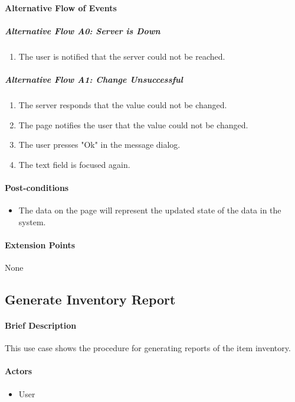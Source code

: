 \documentclass{article}
\begin{document}
\paragraph{Alternative Flow of Events}

\subparagraph{Alternative Flow A0: Server is Down}
\begin{enumerate}
\item The user is notified that the server could not be reached.
\end{enumerate}

\subparagraph{Alternative Flow A1: Change Unsuccessful}
\begin{enumerate}
\item The server responds that the value could not be changed.
\item The page notifies the user that the value could not be changed.
\item The user presses "Ok" in the message dialog.
\item The text field is focused again.
\end{enumerate}

\paragraph{Post-conditions}
\begin{itemize}
\item The data on the page will represent the updated state of the data in the system.
\end{itemize}

\paragraph{Extension Points}
None

\subsection{Generate Inventory Report}

\paragraph{Brief Description}
This use case shows the procedure for generating reports of the item inventory.

\paragraph{Actors}
\begin{itemize}
\item User
\end{itemize}
\end{document}
